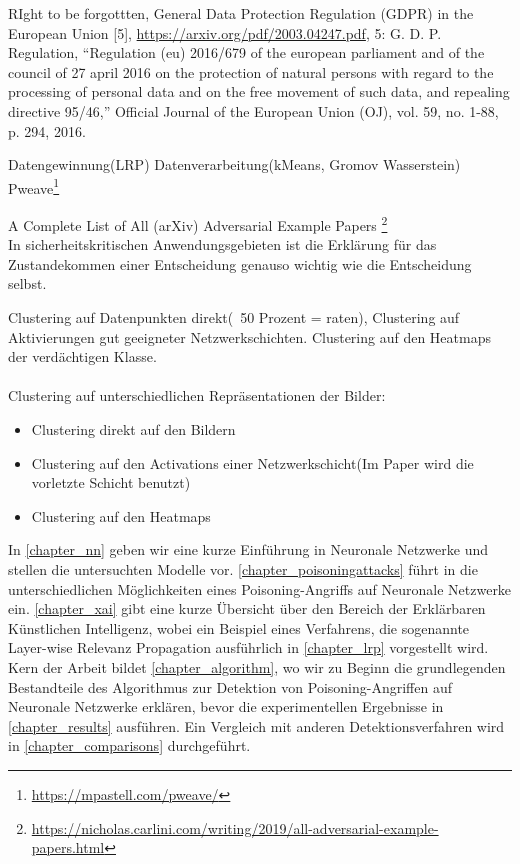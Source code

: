 \documentclass[11pt,a4paper]{article}
\numberwithin{equation}{section}
\begin{document}
	
	
	
	RIght to be forgottten,  General Data Protection Regulation (GDPR) in
	the European Union [5], \url{https://arxiv.org/pdf/2003.04247.pdf}, 5: G. D. P. Regulation, “Regulation (eu) 2016/679 of the
	european parliament and of the council of 27 april 2016
	on the protection of natural persons with regard to the
	processing of personal data and on the free movement
	of such data, and repealing directive 95/46,” Official
	Journal of the European Union (OJ), vol. 59, no. 1-88,
	p. 294, 2016.
	
	Datengewinnung(LRP)
	Datenverarbeitung(kMeans, Gromov Wasserstein)
	Pweave\footnote{\url{https://mpastell.com/pweave/}}
	
	A Complete List of All (arXiv) Adversarial Example Papers \footnote{\url{https://nicholas.carlini.com/writing/2019/all-adversarial-example-papers.html}}
	\\
	In sicherheitskritischen Anwendungsgebieten ist die Erklärung für das Zustandekommen einer Entscheidung genauso wichtig wie die Entscheidung selbst\cite{LRP_DNN}.
	
	Clustering auf Datenpunkten direkt(~50 Prozent = raten), Clustering auf Aktivierungen gut geeigneter Netzwerkschichten. Clustering auf den Heatmaps der verdächtigen Klasse.\\
	\\
	
	Clustering auf unterschiedlichen Repräsentationen der Bilder:
	\begin{itemize}
		\item Clustering direkt auf den Bildern\\
		\item Clustering auf den Activations einer Netzwerkschicht(Im Paper \cite{AC} wird die vorletzte Schicht benutzt)
		\item Clustering auf den Heatmaps
	\end{itemize}
	In \autoref{chapter_nn} geben wir eine kurze Einführung in Neuronale Netzwerke und stellen die untersuchten Modelle vor. \autoref{chapter_poisoningattacks} führt in die unterschiedlichen Möglichkeiten eines Poisoning-Angriffs auf Neuronale Netzwerke ein. \autoref{chapter_xai} gibt eine kurze Übersicht über den Bereich der Erklärbaren Künstlichen Intelligenz, wobei ein Beispiel eines Verfahrens, die sogenannte Layer-wise Relevanz Propagation ausführlich in \autoref{chapter_lrp} vorgestellt wird. Kern der Arbeit bildet \autoref{chapter_algorithm}, wo wir zu Beginn die grundlegenden Bestandteile des Algorithmus zur Detektion von Poisoning-Angriffen auf Neuronale Netzwerke erklären, bevor die experimentellen Ergebnisse in \autoref{chapter_results} ausführen. Ein Vergleich mit anderen Detektionsverfahren wird in \autoref{chapter_comparisons} durchgeführt.
	
\end{document}
